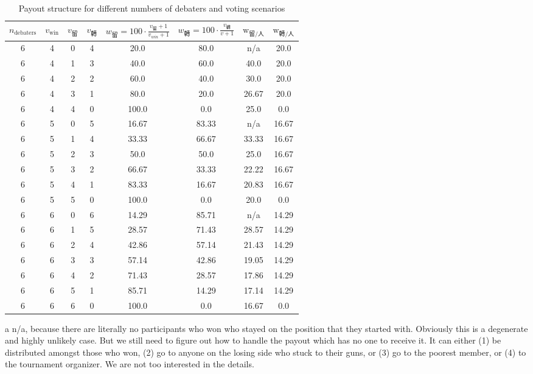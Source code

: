 \begin{table}[h]
    \centering
    \small
    \begin{threeparttable}
    \begin{tabular}{cccccccc}    
    \toprule
    $n_{\text{debaters}}$ & $v_{\text{win}}$ & $v_{\text{留}}$ & $v_{\text{轉}}$ & $w_{\text{留}} = 100 \cdot \frac{v_{\text{留}}+1}{v_{win}+1} $ & $w_{\text{轉}} = 100\cdot\frac{v_{\text{轉}}}{v+1}$ & $\text{w}_{\text{留}/\text{人} }$ & $\text{w}_{\text{轉}/\text{人}}$ \\
    \midrule

6 & 4 & 0 & 4 & 20.0 & 80.0 & n/a\tnote{a} & 20.0 \\
6 & 4 & 1 & 3 & 40.0 & 60.0 & 40.0 & 20.0 \\
6 & 4 & 2 & 2 & 60.0 & 40.0 & 30.0 & 20.0 \\
6 & 4 & 3 & 1 & 80.0 & 20.0 & 26.67 & 20.0 \\
6 & 4 & 4 & 0 & 100.0 & 0.0 & 25.0 & 0.0 \\
6 & 5 & 0 & 5 & 16.67 & 83.33 & n/a\tnote{a} & 16.67 \\
6 & 5 & 1 & 4 & 33.33 & 66.67 & 33.33 & 16.67 \\
6 & 5 & 2 & 3 & 50.0 & 50.0 & 25.0 & 16.67 \\
6 & 5 & 3 & 2 & 66.67 & 33.33 & 22.22 & 16.67 \\
6 & 5 & 4 & 1 & 83.33 & 16.67 & 20.83 & 16.67 \\
6 & 5 & 5 & 0 & 100.0 & 0.0 & 20.0 & 0.0 \\
6 & 6 & 0 & 6 & 14.29 & 85.71 & n/a\tnote{a} & 14.29 \\
6 & 6 & 1 & 5 & 28.57 & 71.43 & 28.57 & 14.29 \\
6 & 6 & 2 & 4 & 42.86 & 57.14 & 21.43 & 14.29 \\
6 & 6 & 3 & 3 & 57.14 & 42.86 & 19.05 & 14.29 \\
6 & 6 & 4 & 2 & 71.43 & 28.57 & 17.86 & 14.29 \\
6 & 6 & 5 & 1 & 85.71 & 14.29 & 17.14 & 14.29 \\
6 & 6 & 6 & 0 & 100.0 & 0.0 & 16.67 & 0.0 \\
\bottomrule
\end{tabular}
\begin{tablenotes}
    \item[a] n/a, because there are literally no participants who won who stayed on the position that they started with. 
    Obviously this is a degenerate and highly unlikely case. But we still need to figure out how to handle the payout which has no one to receive it. It can either (1) be distributed amongst those who won, (2) go to anyone on the losing side who stuck to their guns, or (3) go to the poorest member, or (4) to the tournament organizer. We are not too interested in the details. 
\end{tablenotes}
\end{threeparttable}

\caption{Payout structure for different numbers of debaters and voting scenarios}
\end{table}

